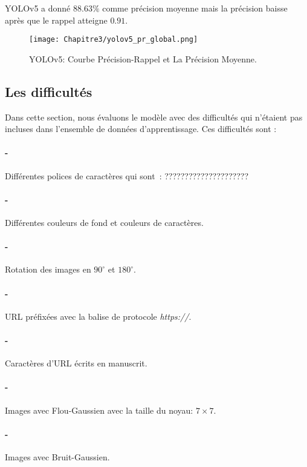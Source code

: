      YOLOv5 a donné $88.63\%$ comme précision moyenne mais la précision baisse après que le rappel atteigne $0.91$.
     \begin{figure}[H]
               \centering
               \texttt{[image: Chapitre3/yolov5\_pr\_global.png]}
               \caption{YOLOv5: Courbe Précision-Rappel et La Précision Moyenne.}
               \label{y5_pr}
               \end{figure}
     
     \subsection{Les difficultés}
          Dans cette section, nous évaluons le modèle avec des difficultés qui n'étaient pas incluses dans l'ensemble de données d'apprentissage. Ces difficultés sont :
          \paragraph{-} Différentes polices de caractères qui sont : ?????????????????????
          \paragraph{-} Différentes couleurs de fond et couleurs de caractères.
          \paragraph{-} Rotation des images en $90^\circ$ et $180^\circ$.
          \paragraph{-} URL préfixées avec la balise de protocole \textit{https://}.
          \paragraph{-} Caractères d'URL écrits en manuscrit.
          \paragraph{-} Images avec Flou-Gaussien avec la taille du noyau: $7\times7$.
          \paragraph{-} Images avec Bruit-Gaussien.

